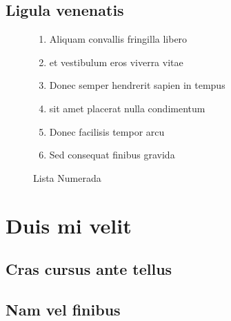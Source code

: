 \lorem[3]

\section{Ligula venenatis}

\lorem[6]

\begin{figure}
\begin{enumerate}
\item Aliquam convallis fringilla libero
\item et vestibulum eros viverra vitae
\item Donec semper hendrerit sapien in tempus
\item sit amet placerat nulla condimentum
\item Donec facilisis tempor arcu
\item Sed consequat finibus gravida
\end{enumerate}
\caption{Lista Numerada}
\end{figure}

\lorem[3]

\chapter{Duis mi velit}

\section{Cras cursus ante tellus}
\lorem[3]

\section{Nam vel finibus}

\lorem[8]
